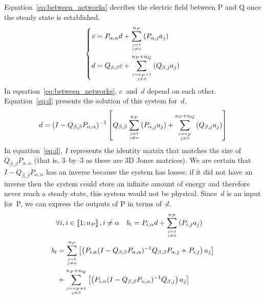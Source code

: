 \documentclass[a4paper,11pt]{article}
\begin{document}
Equation~\eqref{eq:between_networks} decribes the electric field between P and Q once the steady state is established.
\begin{equation}
    \left\lbrace
    \begin{aligned}
        c
        &=
        P_{\alpha, \alpha} d + \sum_{j = 1 \atop j \neq \alpha}^{n_P}
        \left(
            P_{\alpha, j}a_j
        \right)
        \\
        d
        &=
        Q_{\beta, \beta} c + \sum_{j = n_P+1 \atop j \neq \beta}^{n_P + n_Q}
        \left(
            Q_{\beta, j}a_j
        \right)
    \end{aligned}
    \right.
    \label{eq:between_networks}
\end{equation}
In equation~\eqref{eq:between_networks}, $c$~and~$d$ depend on each other.
Equation~\eqref{eq:d} presents the solution of this system for~$d$.
\begin{equation}
    d =
    (I - Q_{\beta, \beta} P_{\alpha, \alpha})^{-1}
    \left[
        Q_{\beta, \beta}
        \sum_{j = 1 \atop j \neq \alpha}^{n_P}
        \left(
            P_{\alpha, j}
            a_j
        \right)
        +
        \sum_{j = n_P \atop j \neq \beta}^{n_P + n_Q}
        \left(
            Q_{\beta, j}
            a_j
        \right)
    \right]
    \label{eq:d}
\end{equation}
In equation~\eqref{eq:d}, $I$ represents the identity matrix that matches the size of $Q_{\beta, \beta}P_{\alpha, \alpha}$ (that is, 3--by--3 as these are 3D Jones matrices).
We are certain that $I - Q_{\beta, \beta} P_{\alpha, \alpha}$ has an inverse because the system has losses:
if it did not have an inverse then the system could store an infinite amount of energy and therefore never reach a steady state, this system would not be physical.
Since~$d$ is an input for~P, we can express the outputs of P in terms of~$d$.
\begin{gather}
\begin{aligned}
    \forall i, i
    &\in
    \left\llbracket 1 ; n_P \right\rrbracket, i \neq \alpha
    &
    b_i
    &=
    P_{i, \alpha} d
    + \sum_{j = 1 \atop j \neq \alpha}^{n_P}
    \left(
        P_{i, j}a_j
    \right)
\end{aligned}
\notag
\\
\begin{aligned}
    b_i
    &=
        \sum_{j = 1 \atop j \neq \alpha}^{n_P}
        \left[
            \left(
                P_{i, \alpha}
                (I - Q_{\beta, \beta} P_{\alpha, \alpha})^{-1}
                Q_{\beta, \beta}
                P_{\alpha, j}
                +
                P_{i, j}
            \right)
            a_j
        \right]
    \\
    &+
        \sum_{j = n_P+1 \atop j \neq \beta}^{n_P + n_Q}
        \left[
            \left(
                P_{i, \alpha}
                (I - Q_{\beta, \beta} P_{\alpha, \alpha})^{-1}
                Q_{\beta, j}
            \right)
            a_j
        \right]
\end{aligned}
\label{eq:P_side_of_S}
\end{gather}
\end{document}
